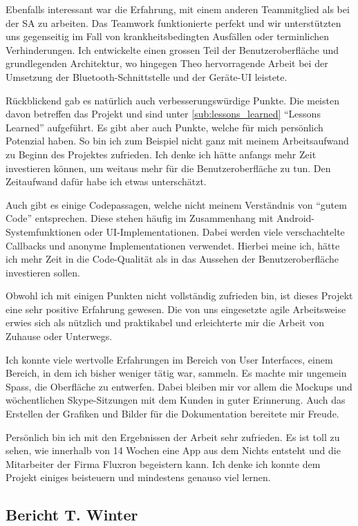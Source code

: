 Ebenfalls interessant war die Erfahrung, mit einem anderen Teammitglied als bei der SA zu arbeiten. Das Teamwork funktionierte perfekt und wir unterstützten uns gegenseitig im Fall von krankheitsbedingten Ausfällen oder terminlichen Verhinderungen. Ich entwickelte einen grossen Teil der Benutzeroberfläche und grundlegenden Architektur, wo hingegen Theo hervorragende Arbeit bei der Umsetzung der Bluetooth-Schnittstelle und der Geräte-UI leistete.

Rückblickend gab es natürlich auch verbesserungswürdige Punkte. Die meisten davon betreffen das Projekt und sind unter \ref{sub:lessons_learned} \enquote{Lessons Learned} aufgeführt. Es gibt aber auch Punkte, welche für mich persönlich Potenzial haben. So bin ich zum Beispiel nicht ganz mit meinem Arbeitsaufwand zu Beginn des Projektes zufrieden. Ich denke ich hätte anfangs mehr Zeit investieren können, um weitaus mehr für die Benutzeroberfläche zu tun. Den Zeitaufwand dafür habe ich etwas unterschätzt.

Auch gibt es einige Codepassagen, welche nicht meinem Verständnis von \enquote{gutem Code} entsprechen. Diese stehen häufig im Zusammenhang mit Android-Systemfunktionen oder UI-Implementationen. Dabei werden viele verschachtelte Callbacks und anonyme Implementationen verwendet. Hierbei meine ich, hätte ich mehr Zeit in die Code-Qualität als in das Aussehen der Benutzeroberfläche investieren sollen.

Obwohl ich mit einigen Punkten nicht vollständig zufrieden bin, ist dieses Projekt eine sehr positive Erfahrung gewesen. Die von uns eingesetzte agile Arbeitsweise erwies sich als nützlich und praktikabel und erleichterte mir die Arbeit von Zuhause oder Unterwegs.

Ich konnte viele wertvolle Erfahrungen im Bereich von User Interfaces, einem Bereich, in dem ich bisher weniger tätig war, sammeln. Es machte mir ungemein Spass, die Oberfläche zu entwerfen. Dabei bleiben mir vor allem die Mockups und wöchentlichen Skype-Sitzungen mit dem Kunden in guter Erinnerung. Auch das Erstellen der Grafiken und Bilder für die Dokumentation bereitete mir Freude.

Persönlich bin ich mit den Ergebnissen der Arbeit sehr zufrieden. Es ist toll zu sehen, wie innerhalb von 14 Wochen eine App aus dem Nichts entsteht und die Mitarbeiter der Firma Fluxron begeistern kann. Ich denke ich konnte dem Projekt einiges beisteuern und mindestens genauso viel lernen.

\subsection{Bericht T. Winter}

